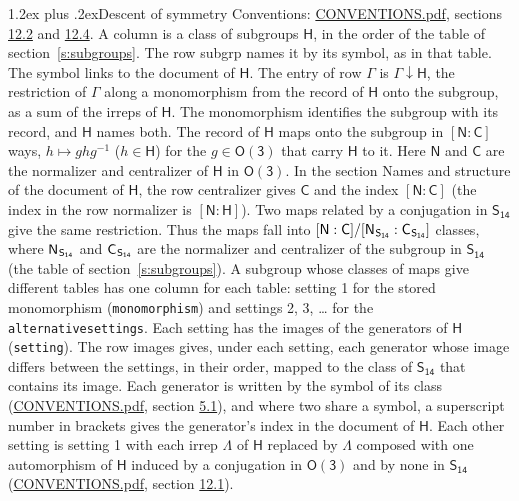 \documentclass[10pt,a4paper]{article}
\makeatletter
\renewcommand\section{\@startsection{section}{1}{\z@}{-3ex plus -1ex minus -.2ex}%
  {1.2ex plus .2ex}{\normalfont\large\sffamily\bfseries\color{parttitle}}}
\numberwithin{equation}{section}
\newcommand{\grp}[1]{\mathsf{#1}}
\newcommand{\grpindex}[2]{[#1 : #2]}
\newcommand{\restr}[2]{#1\!\downarrow#2}
\newcommand{\hairsp}{\mkern1mu}
\makeatother
\begin{document}
\section{Descent of symmetry}\label{s:subduction}
Conventions: \href{../../CONVENTIONS.pdf}{CONVENTIONS.pdf}, sections \href{../../CONVENTIONS.pdf\#conv.12.2}{12.2} and \href{../../CONVENTIONS.pdf\#conv.12.4}{12.4}.
A column is a class of subgroups $\grp{H}$, in the order of the table of section~\ref{s:subgroups}. The row subgrp names it by its symbol, as in that table. The symbol links to the document of $\grp{H}$. The entry of row $\Gamma$ is $\restr{\Gamma}{\grp{H}}$, the restriction of $\Gamma$ along a monomorphism from the record of $\grp{H}$ onto the subgroup, as a sum of the irreps of $\grp{H}$. The monomorphism identifies the subgroup with its record, and $\grp{H}$ names both. \label{n:group.normalizer.o3}\label{n:group.centralizer.o3}The record of $\grp{H}$ maps onto the subgroup in $\grpindex{\grp{N}}{\grp{C}}$ ways, $h \mapsto g h g^{-1}$ ($h \in \grp{H}$) for the $g \in \grp{O(3)}$ that carry $\grp{H}$ to it. Here $\grp{N}$ and $\grp{C}$ are the normalizer and centralizer of $\grp{H}$ in \href{O3.pdf}{$\grp{O(3)}$}. In the section Names and structure of the document of $\grp{H}$, the row centralizer gives $\grp{C}$ and the index $\grpindex{\grp{N}}{\grp{C}}$ (the index in the row normalizer is $\grpindex{\grp{N}}{\grp{H}}$). Two maps related by a conjugation in $\grp{S_{14}}$ give the same restriction. Thus the maps fall into $\grpindex{\grp{N}}{\grp{C}}/\grpindex{\grp{N}_{\hairsp \grp{S_{14}}}}{\grp{C}_{\hairsp \grp{S_{14}}}}$ classes, where $\grp{N}_{\hairsp \grp{S_{14}}}$ and $\grp{C}_{\hairsp \grp{S_{14}}}$ are the normalizer and centralizer of the subgroup in $\grp{S_{14}}$ (the table of section~\ref{s:subgroups}). \label{n:head.setting}A subgroup whose classes of maps give different tables has one column for each table: setting 1 for the stored monomorphism (\texttt{monomorphism}) and settings 2, 3, \dots{} for the \texttt{alternativesettings}. Each setting has the images of the generators of $\grp{H}$ (\texttt{setting}). \label{n:head.images}The row images gives, under each setting, each generator whose image differs between the settings, in their order, mapped to the class of $\grp{S_{14}}$ that contains its image. Each generator is written by the symbol of its class (\href{../../CONVENTIONS.pdf}{CONVENTIONS.pdf}, section \href{../../CONVENTIONS.pdf\#conv.5.1}{5.1}), and where two share a symbol, a superscript number in brackets gives the generator's index in the document of $\grp{H}$. \label{n:irrep.Delta}Each other setting is setting 1 with each irrep $\Lambda$ of $\grp{H}$ replaced by $\Lambda$ composed with one automorphism of $\grp{H}$ induced by a conjugation in \href{O3.pdf}{$\grp{O(3)}$} and by none in $\grp{S_{14}}$ (\href{../../CONVENTIONS.pdf}{CONVENTIONS.pdf}, section \href{../../CONVENTIONS.pdf\#conv.12.1}{12.1}).
\end{document}
